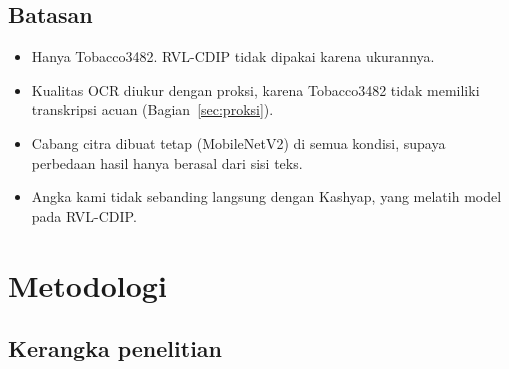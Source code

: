 \documentclass[11pt,a4paper]{article}
\begin{document}
\subsection{Batasan}

\begin{itemize}
  \item Hanya Tobacco3482. RVL-CDIP tidak dipakai karena ukurannya.
  \item Kualitas OCR diukur dengan proksi, karena Tobacco3482 tidak memiliki transkripsi
  acuan (Bagian~\ref{sec:proksi}).
  \item Cabang citra dibuat tetap (MobileNetV2) di semua kondisi, supaya perbedaan hasil
  hanya berasal dari sisi teks.
  \item Angka kami tidak sebanding langsung dengan Kashyap, yang melatih model pada
  RVL-CDIP.
\end{itemize}

\section{Metodologi}

\subsection{Kerangka penelitian}
\end{document}
